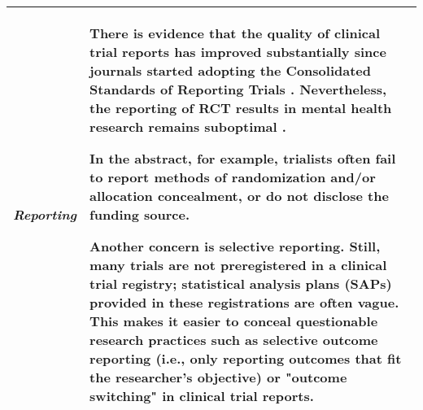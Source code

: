 \begin{table}[!htbp]
    \footnotesize
    \begin{tabular}{  p{3cm}  p{11cm} }
\vspace{1mm}
\emph{Reporting} 

& \vspace{1mm} There is evidence that the quality of clinical trial reports has improved substantially since journals started adopting the Consolidated Standards of Reporting Trials \cite[CONSORT; ][]{kane2007reporting, plint2006does}. Nevertheless, the reporting of RCT results in mental health research remains suboptimal \citep{dal2017prudence, song2017assessing}.  \newline

In the abstract, for example, trialists often fail to report methods of randomization and/or allocation concealment, or do not disclose the funding source. \newline

Another concern is selective reporting. Still, many trials are not preregistered in a clinical trial registry; statistical analysis plans (SAPs) provided in these registrations are often vague. This makes it easier to conceal questionable research practices such as selective outcome reporting (i.e., only reporting outcomes that fit the researcher's objective) or "outcome switching" \citep{altman2017harms} in clinical trial reports.

\vspace{2.5mm} \\
        \bottomrule
    \end{tabular}
    \vspace{20cm}
\end{table}

\clearpage
